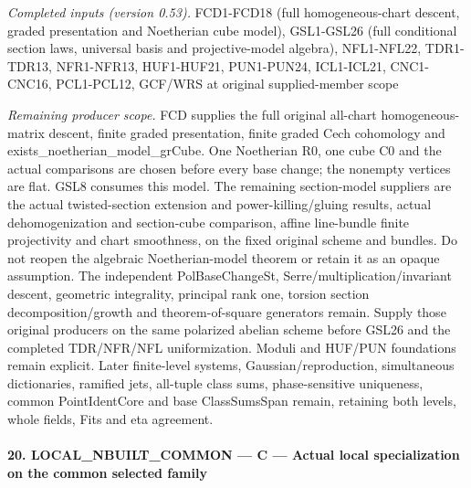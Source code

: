 \emph{Completed inputs (version 0.53).} FCD1-FCD18 (full homogeneous-chart descent, graded presentation and Noetherian cube model), GSL1-GSL26 (full conditional section laws, universal basis and projective-model algebra), NFL1-NFL22, TDR1-TDR13, NFR1-NFR13, HUF1-HUF21, PUN1-PUN24, ICL1-ICL21, CNC1-CNC16, PCL1-PCL12, GCF/WRS at original supplied-member scope

\emph{Remaining producer scope.} FCD supplies the full original all-chart homogeneous-matrix descent, finite graded presentation, finite graded Cech cohomology and exists\_\allowbreak noetherian\_\allowbreak model\_\allowbreak grCube. One Noetherian R0, one cube C0 and the actual comparisons are chosen before every base change; the nonempty vertices are flat. GSL8 consumes this model. The remaining section-model suppliers are the actual twisted-section extension and power-killing/gluing results, actual dehomogenization and section-cube comparison, affine line-bundle finite projectivity and chart smoothness, on the fixed original scheme and bundles. Do not reopen the algebraic Noetherian-model theorem or retain it as an opaque assumption. The independent PolBaseChangeSt, Serre/multiplication/invariant descent, geometric integrality, principal rank one, torsion section decomposition/growth and theorem-of-square generators remain. Supply those original producers on the same polarized abelian scheme before GSL26 and the completed TDR/NFR/NFL uniformization. Moduli and HUF/PUN foundations remain explicit. Later finite-level systems, Gaussian/reproduction, simultaneous dictionaries, ramified jets, all-tuple class sums, phase-sensitive uniqueness, common PointIdentCore and base ClassSumsSpan remain, retaining both levels, whole fields, Fits and eta agreement.



\paragraph{20. LOCAL\_\allowbreak NBUILT\_\allowbreak COMMON — C — Actual local specialization on the common selected family}

